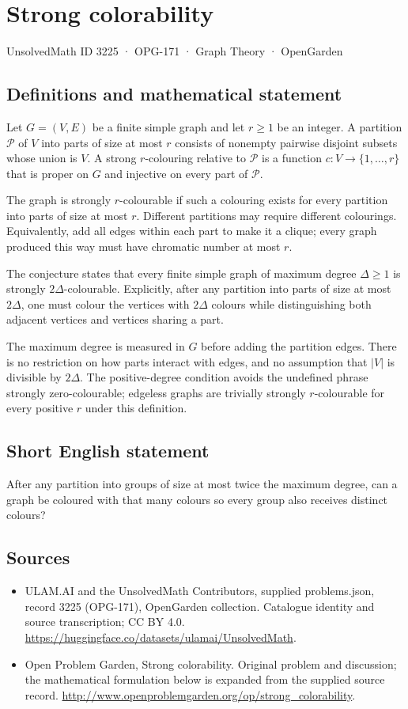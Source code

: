 \documentclass[11pt,a4paper]{article}
\begin{document}
\section*{Strong colorability}\label{3225}
{\small UnsolvedMath ID 3225 · OPG-171 · Graph Theory · OpenGarden}
\subsection{Definitions and mathematical statement}
Let $G=(V,E)$ be a finite
simple graph and let $r\geq1$
be an integer. A partition
$\mathcal P$ of $V$ into
parts of size at most $r$
consists of nonempty pairwise
disjoint subsets whose union
is $V$. A strong $r$-colouring
relative to $\mathcal P$ is
a function $c:V\to\{1,\ldots,r\}$
that is proper on $G$ and
injective on every part of
$\mathcal P$.

The graph is strongly
$r$-colourable if such a
colouring exists for every
partition into parts of size
at most $r$. Different
partitions may require different
colourings. Equivalently, add
all edges within each part
to make it a clique; every
graph produced this way must
have chromatic number at
most $r$.

The conjecture states that
every finite simple graph
of maximum degree $\Delta\geq1$
is strongly $2\Delta$-colourable.
Explicitly, after any partition
into parts of size at most
$2\Delta$, one must colour
the vertices with $2\Delta$
colours while distinguishing
both adjacent vertices and
vertices sharing a part.

The maximum degree is measured
in $G$ before adding the
partition edges. There is
no restriction on how parts
interact with edges, and no
assumption that $|V|$ is
divisible by $2\Delta$.
The positive-degree condition
avoids the undefined phrase
strongly zero-colourable; edgeless
graphs are trivially strongly
$r$-colourable for every
positive $r$ under this
definition.
\subsection{Short English statement}
After any partition into groups of size at most twice the maximum degree, can a graph be coloured with that many colours so every group also receives distinct colours?
\subsection{Sources}
\begin{itemize}
\item[S1] ULAM.AI and the UnsolvedMath Contributors, supplied problems.json, record 3225 (OPG-171), OpenGarden collection. Catalogue identity and source transcription; CC BY 4.0.
\url{https://huggingface.co/datasets/ulamai/UnsolvedMath}.
\item[S2] Open Problem Garden, Strong colorability. Original problem and discussion; the mathematical formulation below is expanded from the supplied source record.
\url{http://www.openproblemgarden.org/op/strong_colorability}.
\end{itemize}
\end{document}
